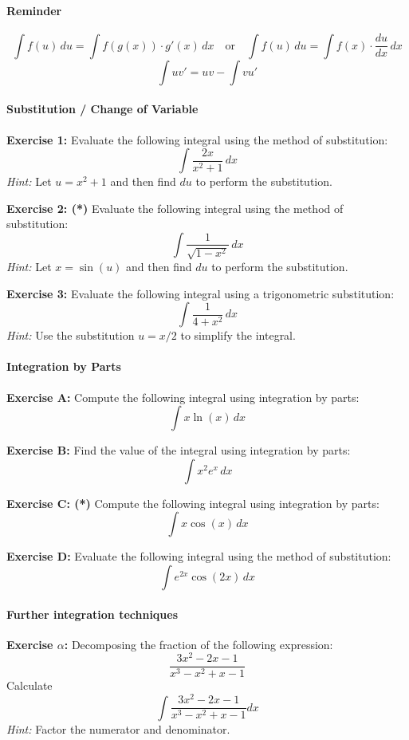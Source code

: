 \documentclass[]{article}
\begin{document}
	\paragraph{Reminder}
	$$\int f(u) \, du = \int f(g(x)) \cdot g'(x) \, dx \quad \text {or} \quad \int f(u) \, du = \int f(x) \cdot \frac{du}{dx} \, dx$$
	$$\int u v' = uv - \int v u'$$
	
	\paragraph{Substitution / Change of Variable}\mbox{}
	
	
	\textbf{Exercise 1:}
	Evaluate the following integral using the method of substitution:
	\[
	\int \frac{2x}{x^2 + 1} \, dx
	\]
	\textit{Hint:} Let \( u = x^2 + 1 \) and then find \( du \) to perform the substitution.
	
	\textbf{Exercise 2: (*)}
	Evaluate the following integral using the method of substitution:
	\[
	\int \frac{1}{\sqrt{1 - x^2}} \, dx
	\]
	\textit{Hint:} Let \( x = \sin(u) \) and then find \( du \) to perform the substitution.
	
	\textbf{Exercise 3:}
	Evaluate the following integral using a trigonometric substitution:
	\[
	\int \frac{1}{4 + x^2} \, dx
	\]
	\textit{Hint:} Use the substitution \(u = x/2\) to simplify the integral.
	
	
	\paragraph{Integration by Parts}\mbox{}
	
	\textbf{Exercise A:}
	Compute the following integral using integration by parts:
	\[
	\int x \ln(x) \, dx
	\]
	
	\textbf{Exercise B:}
	Find the value of the integral using integration by parts:
	\[
	\int x^2 e^x \, dx
	\]
	
	\textbf{Exercise C: (*)}
	Compute the following integral using integration by parts:
	\[
	\int x \cos(x) \, dx
	\]
	
	\textbf{Exercise D:}
	Evaluate the following integral using the method of substitution:
	\[
	\int e^{2x} \cos(2x) \, dx
	\]
	
	
	\paragraph{Further integration techniques}\mbox{}
	
	\textbf{Exercise $\alpha$:}
	Decomposing the fraction of the following expression:
	\[
	\frac{3x^2 - 2x - 1}{x^3 - x^2 + x - 1}
	\]
	Calculate
	\[
	\int \frac{3x^2 - 2x - 1}{x^3 - x^2 + x - 1} dx
	\]
	\textit{Hint:} Factor the numerator and denominator.
	
\end{document}
